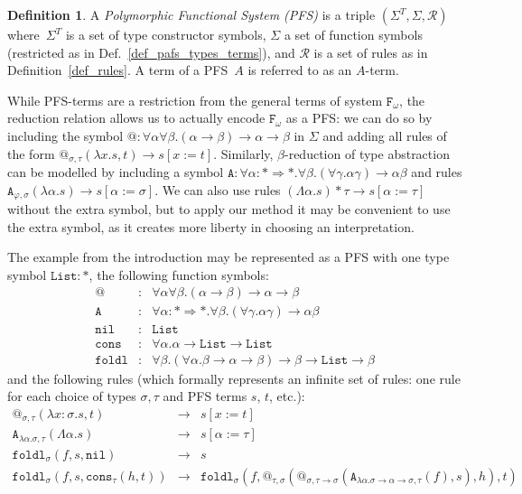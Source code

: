 \documentclass[a4paper,UKenglish,cleveref,autoref,numberwithinsect]{lipics-v2019}
\theoremstyle{definition}
\newtheorem{defn}[theorem]{Definition}
\newcommand{\Fomega}{\mathtt{F}_\omega}
\newcommand{\Rules}{\mathcal{R}}
\newcommand{\arrkind}{\Rightarrow}
\newcommand{\arrtype}{\rightarrow}
\newcommand{\abs}[2]{\lambda #1.#2}
\newcommand{\tabs}[2]{\Lambda #1.#2}
\newcommand{\red}{\longrightarrow}
\newcommand{\List}{\mathtt{List}}
\newcommand{\nil}{\mathtt{nil}}
\newcommand{\cons}{\mathtt{cons}}
\begin{document}
\begin{defn}\label{def_pafs}
  A \emph{Polymorphic Functional System (PFS)} is a triple
  $(\Sigma^T,\Sigma,\Rules)$ where~$\Sigma^T$ is a set of type
  constructor symbols, $\Sigma$ a set of function symbols (restricted
  as in Def.~\ref{def_pafs_types_terms}), and $\Rules$ is a set
  of rules as in Definition~\ref{def_rules}. A term of a
  PFS~$A$ is referred to as an $A$-term.
\end{defn}

While PFS-terms are a restriction from the general terms
of system $\Fomega$, the reduction relation allows us to actually encode
\pagebreak
$\Fomega$ as a PFS: we can do so by including the symbol
${@} : \forall\alpha\forall\beta . (\alpha \arrtype \beta) \arrtype \alpha
\arrtype \beta$ in $\Sigma$ and adding all rules of the form
$@_{\sigma,\tau}(\abs{x}{s},t) \red s[x:=t]$.
Similarly, $\beta$-reduction of type abstraction can be modelled
by including a symbol
$\mathtt{A} : \forall \alpha : * \arrkind * . \forall \beta . (\forall
\gamma.\alpha \gamma) \arrtype \alpha \beta$ and rules
$\mathtt{A}_{\varphi,\sigma}(\abs{\alpha}{s}) \red s[\alpha:=\sigma]$.
We can also use rules
$(\tabs{\alpha}{s})*\tau \red s[\alpha:=\tau]$ without the extra
symbol, but to apply our method it may be
convenient
to use the extra symbol, as
it creates more liberty in choosing an interpretation.

\begin{example}\label{ex_fold_pafs}
  The example from the introduction may be represented as a PFS with
  one type symbol $\mathtt{List} : *$, the following function symbols:
  \[
  \begin{array}{rcl}
    @ & : & \forall \alpha \forall \beta . (\alpha \arrtype \beta) \arrtype \alpha \arrtype \beta \\
    \mathtt{A} & : & \forall \alpha : * \arrkind * . \forall \beta .
    (\forall \gamma .\alpha \gamma) \arrtype \alpha \beta \\
    \mathtt{nil} & : & \List \\
    \mathtt{cons} & : & \forall \alpha . \alpha \arrtype \List \arrtype \List \\
    \mathtt{foldl} & : & \forall \beta . (\forall \alpha . \beta \arrtype \alpha \arrtype \beta) \arrtype \beta \arrtype \List \arrtype \beta
  \end{array}
  \]
  and the following rules (which formally represents an
  infinite set of rules: one rule for each choice of types $\sigma,
  \tau$ and PFS terms $s$, $t$, etc.):
  \[
  \begin{array}{rcl}
    @_{\sigma,\tau}(\abs{x:\sigma}{s},t) & \red & s[x:=t] \\
    \mathtt{A}_{\abs{\alpha}{\sigma},\tau}(\tabs{\alpha}{s}) & \red &
    s[\alpha:=\tau] \\
    \mathtt{foldl}_\sigma(f,s,\nil) & \red & s \\
    \mathtt{foldl}_\sigma(f,s,\cons_\tau(h,t)) & \red & \mathtt{foldl}_\sigma(f,@_{\tau,\sigma}(@_{\sigma,\tau
    \arrtype\sigma}(\mathtt{A}_{\abs{\alpha}{\sigma\arrtype\alpha\arrtype\sigma},\tau}(f),s),h),t)
  \end{array}
  \]
\end{example}
\end{document}
